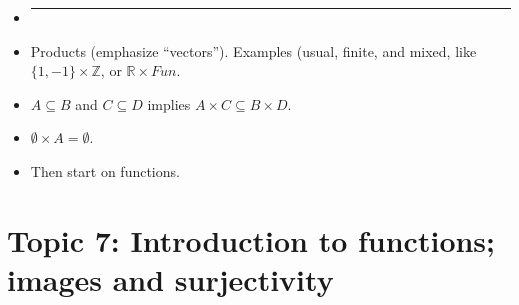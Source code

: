 \documentclass[12pt]{article}
\newcommand{\Z}{{\mathbb Z}}
\newcommand{\R}{{\mathbb R}}
\begin{document}
\begin{itemize}
\begin{enumerate}
 \end{enumerate}
\item []       \vspace{0.1cm}\hrule\vspace{-0.4cm}     
\item Products (emphasize ``vectors''). Examples (usual, finite, and mixed, like $\{1,-1\} \times \Z$, or $\R \times Fun$.
\item  $A \subseteq B$ and $C \subseteq D$ implies $A \times C \subseteq B \times D$.
\item $\emptyset \times A = \emptyset.$
 
\item Then start on functions.
\end{itemize}








\newpage
\section[7 (\csname dateWeek7\endcsname): Introduction to functions; images and surjectivity.]{Topic  7: Introduction to functions; images and surjectivity}
\end{document}

